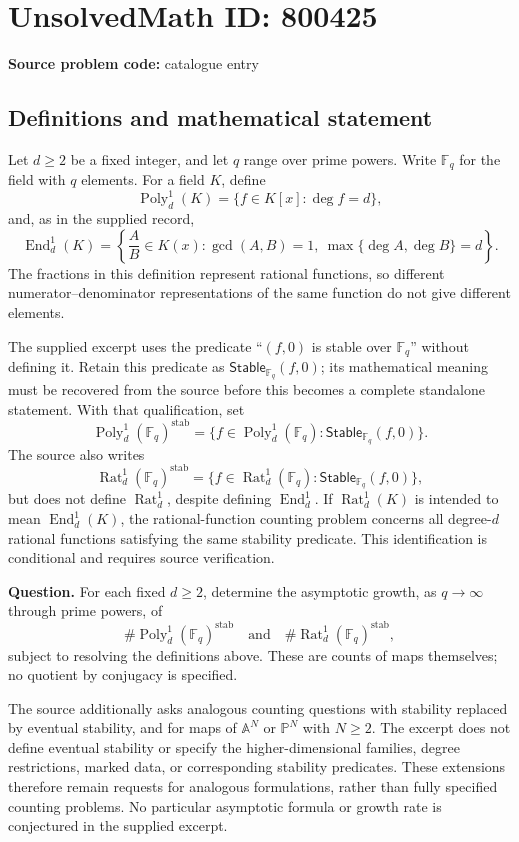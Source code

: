 \documentclass[11pt]{article}
\newcommand{\F}{\mathbb{F}}
\newcommand{\A}{\mathbb{A}}
\newcommand{\PP}{\mathbb{P}}
\begin{document}
\section*{UnsolvedMath ID: 800425}
\textbf{Source problem code:} catalogue entry
\subsection{Definitions and mathematical statement}
Let \(d\ge 2\) be a fixed integer, and let \(q\) range over prime powers. Write \(\F_q\) for the field with \(q\) elements. For a field \(K\), define
\[
\operatorname{Poly}_d^1(K)=\{f\in K[x]:\deg f=d\},
\]
and, as in the supplied record,
\[
\operatorname{End}_d^1(K)=\left\{\frac{A}{B}\in K(x):\gcd(A,B)=1,\ \max\{\deg A,\deg B\}=d\right\}.
\]
The fractions in this definition represent rational functions, so different numerator--denominator representations of the same function do not give different elements.

The supplied excerpt uses the predicate ``\((f,0)\) is stable over \(\F_q\)'' without defining it. Retain this predicate as \(\mathsf{Stable}_{\F_q}(f,0)\); its mathematical meaning must be recovered from the source before this becomes a complete standalone statement. With that qualification, set
\[
\operatorname{Poly}_d^1(\F_q)^{\mathrm{stab}}
=\{f\in\operatorname{Poly}_d^1(\F_q):\mathsf{Stable}_{\F_q}(f,0)\}.
\]
The source also writes
\[
\operatorname{Rat}_d^1(\F_q)^{\mathrm{stab}}
=\{f\in\operatorname{Rat}_d^1(\F_q):\mathsf{Stable}_{\F_q}(f,0)\},
\]
but does not define \(\operatorname{Rat}_d^1\), despite defining \(\operatorname{End}_d^1\). If \(\operatorname{Rat}_d^1(K)\) is intended to mean \(\operatorname{End}_d^1(K)\), the rational-function counting problem concerns all degree-\(d\) rational functions satisfying the same stability predicate. This identification is conditional and requires source verification.

\textbf{Question.} For each fixed \(d\ge2\), determine the asymptotic growth, as \(q\to\infty\) through prime powers, of
\[
\#\operatorname{Poly}_d^1(\F_q)^{\mathrm{stab}}
\quad\text{and}\quad
\#\operatorname{Rat}_d^1(\F_q)^{\mathrm{stab}},
\]
subject to resolving the definitions above. These are counts of maps themselves; no quotient by conjugacy is specified.

The source additionally asks analogous counting questions with stability replaced by eventual stability, and for maps of \(\A^N\) or \(\PP^N\) with \(N\ge2\). The excerpt does not define eventual stability or specify the higher-dimensional families, degree restrictions, marked data, or corresponding stability predicates. These extensions therefore remain requests for analogous formulations, rather than fully specified counting problems. No particular asymptotic formula or growth rate is conjectured in the supplied excerpt.
\end{document}
